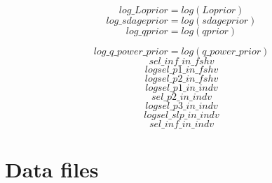 \documentclass{article}
\begin{document}
\begin{equation}
    log\_Loprior = log(Loprior)
\end{equation}
\begin{equation}
    log\_sdageprior = log(sdageprior)
\end{equation}
\begin{equation}
    log\_qprior = log(qprior)
\end{equation}

\begin{equation}
    log\_q\_power\_prior = log(q\_power\_prior)
\end{equation}
\begin{equation}
    sel\_inf\_in\_fshv 
\end{equation}
\begin{equation}
    logsel\_p1\_in\_fshv
\end{equation}
\begin{equation}
 logsel\_p2\_in\_fshv   
\end{equation}
\begin{equation}
    logsel\_p1\_in\_indv
\end{equation}
\begin{equation}
sel\_p2\_in\_indv
\end{equation}
\begin{equation}
    logsel\_p3\_in\_indv
\end{equation}
\begin{equation}
    logsel\_slp\_in\_indv
\end{equation}
\begin{equation}sel\_inf\_in\_indv
\end{equation}


\section{Data files}
\end{document}
